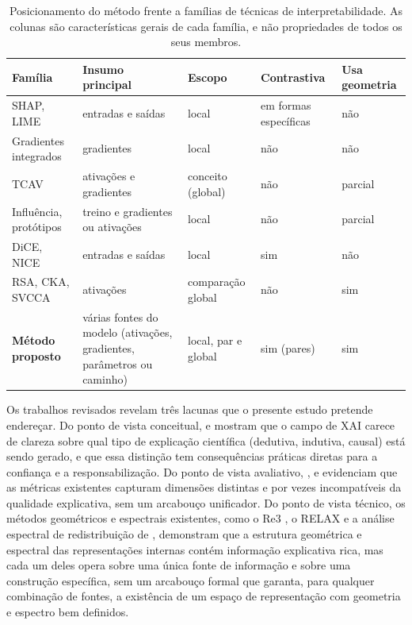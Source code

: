 \begin{table}[pos=htbp]
\centering
\caption{Posicionamento do método frente a famílias de técnicas de interpretabilidade. As colunas são características gerais de cada família, e não propriedades de todos os seus membros.}
\label{tab:comparacao}
\footnotesize
\begin{tabular}{p{3.2cm}p{3.4cm}p{2.0cm}p{1.8cm}p{1.9cm}}
\hline
Família & Insumo principal & Escopo & Contrastiva & Usa geometria \\
\hline
SHAP, LIME & entradas e saídas & local & em formas específicas & não \\
Gradientes integrados & gradientes & local & não & não \\
TCAV & ativações e gradientes & conceito (global) & não & parcial \\
Influência, protótipos & treino e gradientes ou ativações & local & não & parcial \\
DiCE, NICE & entradas e saídas & local & sim & não \\
RSA, CKA, SVCCA & ativações & comparação global & não & sim \\
\textbf{Método proposto} & várias fontes do modelo (ativações, gradientes, parâmetros ou caminho) & local, par e global & sim (pares) & sim \\
\hline
\end{tabular}
\end{table}

Os trabalhos revisados revelam três lacunas que o presente estudo pretende endereçar. Do ponto de vista conceitual, \cite{Graff2025} e \cite{Erasmus2021} mostram que o campo de XAI carece de clareza sobre qual tipo de explicação científica (dedutiva, indutiva, causal) está sendo gerado, e que essa distinção tem consequências práticas diretas para a confiança e a responsabilização. Do ponto de vista avaliativo, \cite{Pawlicki2024}, \cite{Nauta2023} e \cite{Zhou2021} evidenciam que as métricas existentes capturam dimensões distintas e por vezes incompatíveis da qualidade explicativa, sem um arcabouço unificador. Do ponto de vista técnico, os métodos geométricos e espectrais existentes, como o Re3 \citep{Barua2026}, o RELAX \citep{Wickstrom2023} e a análise espectral de redistribuição de \cite{Mae2026}, demonstram que a estrutura geométrica e espectral das representações internas contém informação explicativa rica, mas cada um deles opera sobre uma única fonte de informação e sobre uma construção específica, sem um arcabouço formal que garanta, para qualquer combinação de fontes, a existência de um espaço de representação com geometria e espectro bem definidos.

